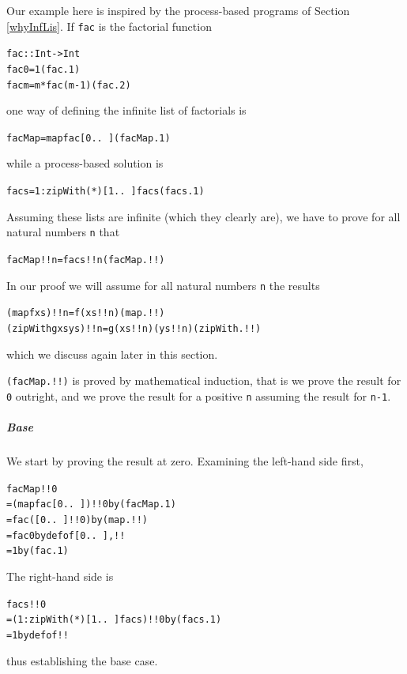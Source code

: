 Our example here is inspired by the process-based programs of Section
\ref{whyInfLis}. If \texttt{fac} is the factorial function
\begin{alltt}
fac :: Int -> Int
fac 0 = 1\hfill (fac.1)
fac m = m * fac (m-1)\hfill (fac.2)
\end{alltt}
one way of defining the infinite list of factorials is
\begin{alltt}
facMap = map fac [0 ..\ ]\hfill (facMap.1) 
\end{alltt}
while a process-based solution is
\begin{alltt}
facs = 1 : zipWith (*) [1 ..\ ] facs\hfill (facs.1)
\end{alltt}
Assuming these lists are infinite (which they clearly are), we have to prove
for all natural numbers \texttt{n} that 
\begin{alltt}
facMap!!n = facs!!n \hfill (facMap.!!)
\end{alltt}
\startpr
In our proof we will assume for all natural numbers \texttt{n} the results
\begin{alltt}
(map f xs)!!n        = f (xs!!n)\hfill (map.!!)
(zipWith g xs ys)!!n = g (xs!!n) (ys!!n)\hfill (zipWith.!!)
\end{alltt}
which we discuss again later in this section.
 
\texttt{(facMap.!!)} is proved by mathematical induction,
that is we prove the result for \texttt{0} outright, and we prove the
result for a positive \texttt{n} assuming the result for \texttt{n-1}.

\subparagraph*{Base}
We start by proving the
result at zero. Examining the left-hand side first,
\begin{alltt}
facMap!!0 
  = (map fac [0 ..\ ])!!0 \hfill {\rm by} (facMap.1)
  = fac ([0 ..\ ]!!0) \hfill {\rm by} (map.!!)
  = fac 0\hfill {\rm by def of} [0 ..\ ],!!
  = 1 \hfill {\rm by} (fac.1)
\end{alltt}
The right-hand side is
\begin{alltt}
facs!!0
  = (1 : zipWith (*) [1 ..\ ] facs)!!0 \hfill {\rm by} (facs.1)
  = 1\hfill {\rm by def of} !!
\end{alltt}
thus establishing the base case. 

